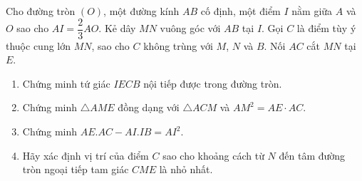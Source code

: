 \begin{ex}%
	Cho đường tròn $(O)$, một đường kính $AB$ cố định, một điểm $I$ nằm giữa $A$ và $O$ sao cho $AI = \dfrac{2}{3}AO$. Kẻ dây $MN$ vuông góc với $AB$ tại $I$. Gọi $C$ là điểm tùy ý thuộc cung lớn $MN$, sao cho $C$ không trùng với $M$, $N$ và $B$. Nối $AC$ cắt $MN$ tại $E$.
	\begin{enumerate}
		\item Chứng minh tứ giác $IECB$ nội tiếp được trong đường tròn.
		\item Chứng minh $\triangle AME$ đồng dạng với $\triangle ACM$ và $AM^2 = AE \cdot AC$.
		\item Chứng minh $AE.AC-AI.IB =AI^2$.
		\item Hãy xác định vị trí của điểm $C$ sao cho khoảng cách từ $N$ đến tâm đường tròn ngoại tiếp tam giác $CME$ là nhỏ nhất. 
	\end{enumerate}
\end{ex}
